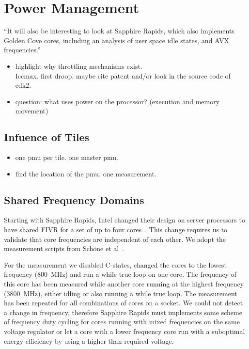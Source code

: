 \chapter{Power Management}
``It will also be interesting to look at Sapphire Rapids, which also implements Golden Cove cores, including an analysis of user space idle states, and AVX frequencies.''


\begin{itemize}
    \item highlight why throttling mechanisms exist.\\
    Iccmax. first droop. maybe cite patent and/or look in the source code of edk2.
    \item question: what uses power on the processor? (execution and memory movement)
\end{itemize}


\section{Infuence of Tiles}
\begin{itemize}
    \item one pmu per tile. one master pmu.
    \item find the location of the pmu. one measurement.
\end{itemize}

\section{Shared Frequency Domains}
Starting with Sapphire Rapids, Intel changed their design on server processors to have shared FIVR for a set of up to four cores~\cite{Intel_2022_ISSCC}.
This change requires us to validate that core frequencies are independent of each other.
We adopt the measurement scripts from Sch\"one et al~\cite{Schoene_2024_Alder_Lake}.

For the measurement we disabled C-states, changed the cores to the lowest frequency (\SI{800}{\MHz}) and run a while true loop on one core.
The frequency of this core has been measured while another core running at the highest frequency (\SI{3800}{\MHz}), either idling or also running a while true loop.
The measurement has been repeated for all combinations of cores on a socket.
We could not detect a change in frequency, therefore Sapphire Rapids must implements some scheme of frequency duty cycling for cores running with mixed frequencies on the same voltage regulator or let a core with a lower frequency core run with a suboptimal energy efficiency by using a higher than required voltage.

